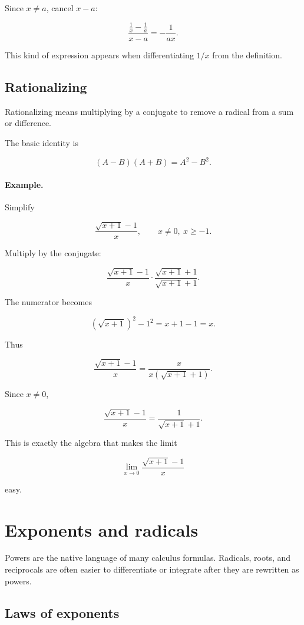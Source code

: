 Since \(x\neq a\), cancel \(x-a\):

\[
\boxed{
\frac{\frac1x-\frac1a}{x-a}
=
-\frac1{ax}.
}
\]

This kind of expression appears when differentiating \(1/x\) from the definition.

\subsection{Rationalizing}
\label{appsubsec:rationalizing}

Rationalizing means multiplying by a conjugate to remove a radical from a sum or
difference.

The basic identity is

\[
(A-B)(A+B)=A^2-B^2.
\]

\paragraph{Example.}
Simplify

\[
\frac{\sqrt{x+1}-1}{x},
\qquad x\neq0,\ x\ge -1.
\]

Multiply by the conjugate:

\[
\frac{\sqrt{x+1}-1}{x}
\cdot
\frac{\sqrt{x+1}+1}{\sqrt{x+1}+1}.
\]

The numerator becomes

\[
(\sqrt{x+1})^2-1^2=x+1-1=x.
\]

Thus

\[
\frac{\sqrt{x+1}-1}{x}
=
\frac{x}{x(\sqrt{x+1}+1)}.
\]

Since \(x\neq0\),

\[
\boxed{
\frac{\sqrt{x+1}-1}{x}
=
\frac{1}{\sqrt{x+1}+1}.
}
\]

This is exactly the algebra that makes the limit

\[
\lim_{x\to0}\frac{\sqrt{x+1}-1}{x}
\]

easy.

\section{Exponents and radicals}
\label{appsec:exponents-radicals}

Powers are the native language of many calculus formulas.  Radicals, roots, and
reciprocals are often easier to differentiate or integrate after they are rewritten as
powers.

\subsection{Laws of exponents}
\label{appsubsec:laws-exponents}

